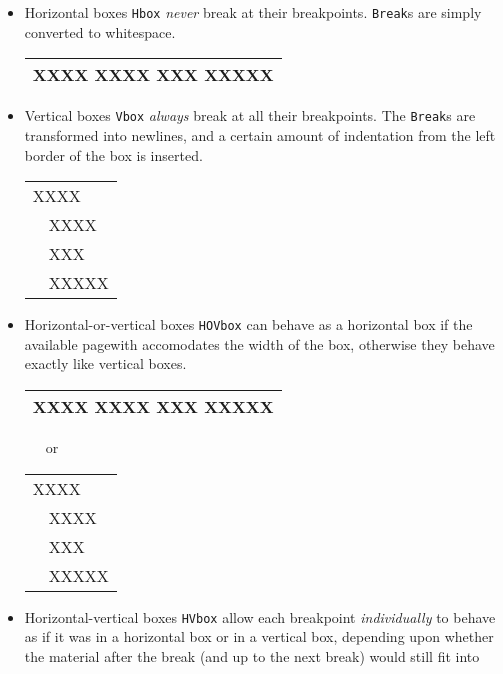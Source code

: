   \begin{itemize}
   \item Horizontal boxes {\tt Hbox} {\em never} break at their breakpoints.
         {\tt Break}s are simply converted to whitespace.
    \begin{center}
      \begin{tabular}{|l|}
       \hline
        XXXX XXXX XXX XXXXX\\ 
       \hline
      \end{tabular}
    \end{center}
   \item Vertical boxes {\tt Vbox} {\em always} break at all their
     breakpoints. The {\tt Break}s are transformed into
     newlines, and a certain amount of indentation from the left border of
     the box is inserted.
    \begin{center}
      \begin{tabular}{|l|}
       \hline
        XXXX \\
        ~~XXXX\\
        ~~XXX\\
        ~~XXXXX\\ 
       \hline
      \end{tabular}
    \end{center}
    \item Horizontal-or-vertical boxes {\tt HOVbox}
      can behave as a horizontal
      box if the available pagewith accomodates the width of the
      box, otherwise they behave exactly like vertical boxes.
    \begin{center}
      \begin{tabular}{|l|}
       \hline
        XXXX XXXX XXX XXXXX\\ 
       \hline
      \end{tabular}
      ~~~or~~~
      \begin{tabular}{|l|}
       \hline
        XXXX \\
        ~~XXXX\\
        ~~XXX\\
        ~~XXXXX\\ 
       \hline
      \end{tabular}
    \end{center}
   \item Horizontal-vertical boxes {\tt HVbox} allow each
     breakpoint {\em individually} to behave as if it was in a horizontal
     box or in a vertical box, depending upon whether the material
     after the break (and up to the next break) would still fit into

\end{itemize}
